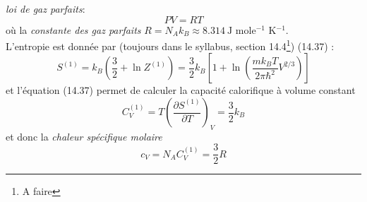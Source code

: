 \documentclass[british,french,11pt, a4paper, openany]{book}
\begin{document}
\textit{loi de gaz parfaits}:
\begin{equation}
	PV = RT
\end{equation}
où la \textit{constante des gaz parfaits} $R = N_Ak_B \approx 8.314\ \text{J mole$^{-1}$ K$^{-1}$}$.\\
L'entropie est donnée par (toujours dans le syllabus, section 14.4\footnote{A faire}) (14.37) :
\begin{equation}
	S^{(1)} = k_B(\frac{3}{2}+\ln Z^{(1)}) = \frac{3}{2}k_B\left[1+\ln\left(\dfrac{mk_BT}{2\pi\hbar^2}V^{
		2/3}\right)\right]
\end{equation}
et l'équation (14.37) permet de calculer la capacité calorifique à volume constant 
\begin{equation}
	C_V^{(1)} = T\left(\frac{\partial S^{(1)}}{\partial T}\right)_V = \frac{3}{2}k_B
\end{equation}
et donc la \textit{chaleur spécifique molaire}
\begin{equation}
	c_V = N_AC_V^ {(1)} = \frac{3}{2}R
\end{equation}
\end{document}
